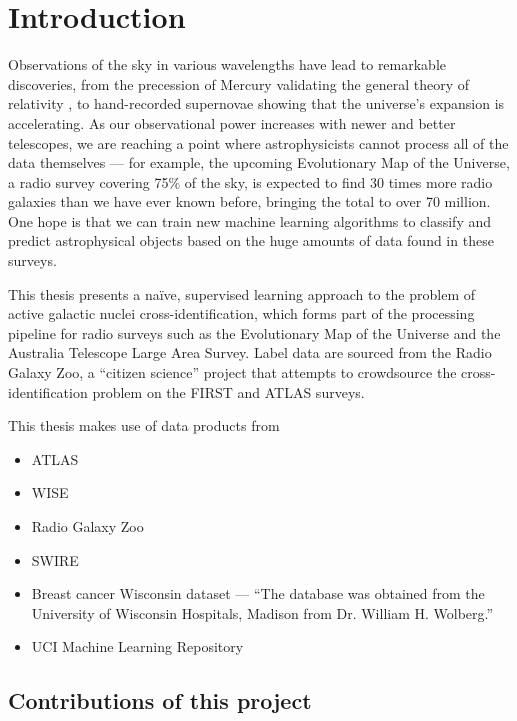 
\chapter{Introduction}
\label{cha:intro}

Observations of the sky in various wavelengths have lead to remarkable discoveries, from the precession of Mercury validating the general theory of relativity , to hand-recorded supernovae showing that the universe's expansion is accelerating. As our observational power increases with newer and better telescopes, we are reaching a point where astrophysicists cannot process all of the data themselves --- for example, the upcoming Evolutionary Map of the Universe, a radio survey covering 75\% of the sky, is expected to find 30 times more radio galaxies than we have ever known before, bringing the total to over 70 million. One hope is that we can train new machine learning algorithms to classify and predict astrophysical objects based on the huge amounts of data found in these surveys.

This thesis presents a na\"ive, supervised learning approach to the problem of active galactic nuclei cross-identification, which forms part of the processing pipeline for radio surveys such as the Evolutionary Map of the Universe and the Australia Telescope Large Area Survey. Label data are sourced from the Radio Galaxy Zoo, a ``citizen science'' project that attempts to crowdsource the cross-identification problem on the FIRST and ATLAS surveys.


This thesis makes use of data products from
\begin{itemize}
    \item ATLAS
    \item WISE
    \item Radio Galaxy Zoo
    \item SWIRE
    \item Breast cancer Wisconsin dataset --- ``The database was obtained from the University of Wisconsin Hospitals, Madison from Dr. William H. Wolberg.''
    \item UCI Machine Learning Repository
\end{itemize}


\section{Contributions of this project}

